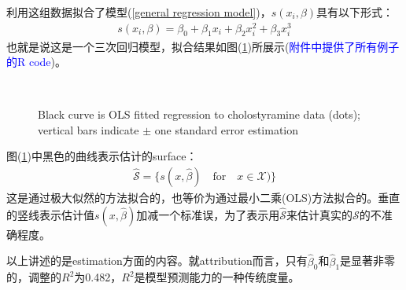 \documentclass[lang=cn,11pt,a4paper,cite=authoryear]{elegantpaper}
\begin{document}
利用这组数据拟合了模型(\ref{general regression model})，$s\left(x_{i}, \beta\right)$具有以下形式：
\begin{align}
s\left(x_{i}, \beta\right)=\beta_{0}+\beta_{1} x_{i}+\beta_{2} x_{i}^{2}+\beta_{3} x_{i}^{3}
\end{align}
也就是说这是一个三次回归模型，拟合结果如图(\ref{fig1})所展示(\textcolor{blue}{附件中提供了所有例子的R code})。
\begin{figure}[H]
		\centering
		\\
		\caption{Black curve is OLS fitted regression to cholostyramine data (dots); vertical bars indicate $\pm$ one standard error estimation}
		\label{fig1}
\end{figure}

图(\ref{fig1})中黑色的曲线表示估计的surface：
\begin{align}
	\widehat{\mathcal{S}} = \{s(x, \widehat{\beta}) \quad \text{for} \quad x \in \mathcal{X}) \}
\end{align}
这是通过极大似然的方法拟合的，也等价为通过最小二乘(OLS)方法拟合的。垂直的竖线表示估计值$s(x, \widehat{\beta})$加减一个标准误，为了表示用$\widehat{\mathcal{S}}$来估计真实的$\mathcal{S}$的不准确程度。

以上讲述的是estimation方面的内容。就attribution而言，只有$\widehat{\beta}_0$和$\widehat{\beta}_1$是显著非零的，调整的$R^2$为0.482，$R^2$是模型预测能力的一种传统度量。
\end{document}
